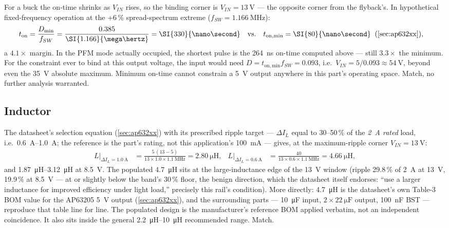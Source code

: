 For a buck the on-time shrinks as $V_{IN}$ rises, so the binding corner is
$V_{IN}=\SI{13}{\volt}$ --- the opposite corner from the flyback's. In hypothetical
fixed-frequency operation at the +6\,\% spread-spectrum extreme
($f_{SW} = \SI{1.166}{\mega\hertz}$):
\begin{align*}
  t_{\mathrm{on}} &= \frac{D_{\min}}{f_{SW}}
    = \frac{0.385}{\SI{1.166}{\mega\hertz}} = \SI{330}{\nano\second}
    \quad\text{vs.}\quad t_{\mathrm{on,min}} = \SI{80}{\nano\second}
    \;\;(\cref{sec:ap632xx}),
\end{align*}
a $4.1\times$ margin. In the PFM mode actually occupied, the shortest pulse is the
\SI{264}{\nano\second} on-time computed above --- still $3.3\times$ the minimum. For the
constraint ever to bind at this output voltage, the input would need
$D = t_{\mathrm{on,min}} f_{SW} = 0.093$, i.e.\ $V_{IN} = 5/0.093 \approx \SI{54}{\volt}$,
beyond even the \SI{35}{\volt} absolute maximum. Minimum on-time cannot constrain a 5~V
output anywhere in this part's operating space. Match, no further analysis warranted.

\subsection{Inductor}\label{sec:5v-inductor}

The datasheet's selection equation (\cref{sec:ap632xx}) with its prescribed ripple target
--- $\Delta I_L$ equal to 30--50\,\% of the \emph{2~A rated} load, i.e.\
\SIrange{0.6}{1.0}{\ampere}; the reference is the part's rating, not this application's
100~mA --- gives, at the maximum-ripple corner $V_{IN}=\SI{13}{\volt}$:
\begin{align*}
  L\big|_{\Delta I_L = \SI{1.0}{\ampere}} &=
    \frac{5\,(13-5)}{13 \times 1.0 \times \SI{1.1}{\mega\hertz}} = \SI{2.80}{\micro\henry},
  &
  L\big|_{\Delta I_L = \SI{0.6}{\ampere}} &=
    \frac{40}{13 \times 0.6 \times \SI{1.1}{\mega\hertz}} = \SI{4.66}{\micro\henry},
\end{align*}
and \SIrange{1.87}{3.12}{\micro\henry} at \SI{8.5}{\volt}. The populated
\SI{4.7}{\micro\henry} sits at the large-inductance edge of the 13~V window (ripple
29.8\,\% of 2~A at \SI{13}{\volt}, 19.9\,\% at \SI{8.5}{\volt} --- at or slightly below
the band's 30\,\% floor, the benign direction, which the datasheet itself endorses:
``use a larger inductance for improved efficiency under light load,'' precisely this
rail's condition). More directly: \SI{4.7}{\micro\henry} is the datasheet's own Table-3
BOM value for the AP63205 5~V output (\cref{sec:ap632xx}), and the surrounding parts ---
\SI{10}{\micro\farad} input, $2\times\SI{22}{\micro\farad}$ output,
\SI{100}{\nano\farad} BST --- reproduce that table line for line. The populated design is
the manufacturer's reference BOM applied verbatim, not an independent coincidence.
It also sits inside the general \SIrange{2.2}{10}{\micro\henry} recommended range. Match.


